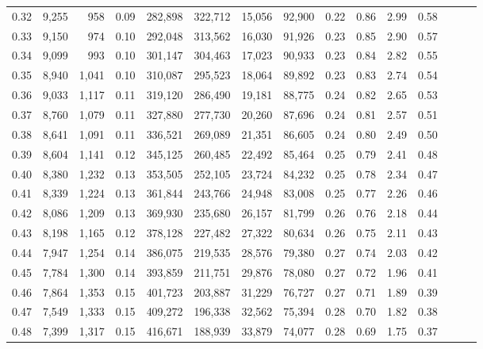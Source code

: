 \begin{tabular}{rrrrrrrrrrrrrrr}
0.32 &   9,255 &    958 &  0.09 &  282,898 &  322,712 &   15,056 &   92,900 &  0.22 &  0.86 &  2.99 &      0.58 \\
0.33 &   9,150 &    974 &  0.10 &  292,048 &  313,562 &   16,030 &   91,926 &  0.23 &  0.85 &  2.90 &      0.57 \\
0.34 &   9,099 &    993 &  0.10 &  301,147 &  304,463 &   17,023 &   90,933 &  0.23 &  0.84 &  2.82 &      0.55 \\
0.35 &   8,940 &  1,041 &  0.10 &  310,087 &  295,523 &   18,064 &   89,892 &  0.23 &  0.83 &  2.74 &      0.54 \\
0.36 &   9,033 &  1,117 &  0.11 &  319,120 &  286,490 &   19,181 &   88,775 &  0.24 &  0.82 &  2.65 &      0.53 \\
0.37 &   8,760 &  1,079 &  0.11 &  327,880 &  277,730 &   20,260 &   87,696 &  0.24 &  0.81 &  2.57 &      0.51 \\
0.38 &   8,641 &  1,091 &  0.11 &  336,521 &  269,089 &   21,351 &   86,605 &  0.24 &  0.80 &  2.49 &      0.50 \\
0.39 &   8,604 &  1,141 &  0.12 &  345,125 &  260,485 &   22,492 &   85,464 &  0.25 &  0.79 &  2.41 &      0.48 \\
0.40 &   8,380 &  1,232 &  0.13 &  353,505 &  252,105 &   23,724 &   84,232 &  0.25 &  0.78 &  2.34 &      0.47 \\
0.41 &   8,339 &  1,224 &  0.13 &  361,844 &  243,766 &   24,948 &   83,008 &  0.25 &  0.77 &  2.26 &      0.46 \\
0.42 &   8,086 &  1,209 &  0.13 &  369,930 &  235,680 &   26,157 &   81,799 &  0.26 &  0.76 &  2.18 &      0.44 \\
0.43 &   8,198 &  1,165 &  0.12 &  378,128 &  227,482 &   27,322 &   80,634 &  0.26 &  0.75 &  2.11 &      0.43 \\
0.44 &   7,947 &  1,254 &  0.14 &  386,075 &  219,535 &   28,576 &   79,380 &  0.27 &  0.74 &  2.03 &      0.42 \\
0.45 &   7,784 &  1,300 &  0.14 &  393,859 &  211,751 &   29,876 &   78,080 &  0.27 &  0.72 &  1.96 &      0.41 \\
0.46 &   7,864 &  1,353 &  0.15 &  401,723 &  203,887 &   31,229 &   76,727 &  0.27 &  0.71 &  1.89 &      0.39 \\
0.47 &   7,549 &  1,333 &  0.15 &  409,272 &  196,338 &   32,562 &   75,394 &  0.28 &  0.70 &  1.82 &      0.38 \\
0.48 &   7,399 &  1,317 &  0.15 &  416,671 &  188,939 &   33,879 &   74,077 &  0.28 &  0.69 &  1.75 &      0.37 \\

\end{tabular}
